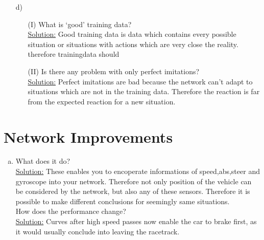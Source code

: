 \documentclass[DIN, pagenumber=false, fontsize=11pt, parskip=half]{scrartcl}
\newcommand{\sol}{\underline{Solution:} }
\begin{document}
\begin{enumerate}[b)]
	changing the hyper-parameters? Can you explain this?\\\sol
	Yes, it can be archived. As you change the Hyperparameter, you change the behaviour or the calculation of the network. Therefore it is possible, that you can optimize by changing them.\\
	Low learningrate with few epochs results in a bad learning.
	\item[d)] \begin{enumerate}
		\item[(I)] What is ‘good’ training data? \\\sol
		Good training data is data which contains every possible situation or situations with actions which are very close the reality. therefore trainingdata should 
		\item[(II)] Is there any problem with only perfect imitations?\\\sol
		Perfect imitations are bad because the network can't adapt to situations which are not in the training data. Therefore the reaction is far from the expected reaction for a new situation.
	\end{enumerate}
\end{enumerate}
\section{Network Improvements}
\begin{enumerate}[a)]
	\item What does it do?\\\sol These enables you to encoperate informations of speed,abs,steer and gyroscope into your network. Therefore not only position of the vehicle can be considered by the network, but also any of these sensors. Therefore it is possible to make different conclusions for seemingly same situations.\\
	How does the
	performance change?
	\\\sol Curves after high speed passes now enable the car to brake first, as it would usually conclude into leaving the racetrack.
\end{enumerate}
\end{document}
